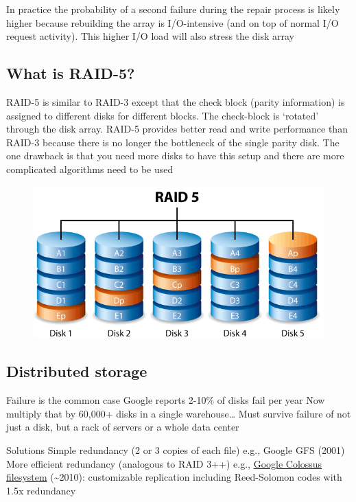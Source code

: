 In practice the probability of a second failure during the repair process is likely higher because rebuilding the array is I/O-intensive (and on top of normal I/O request activity). This higher I/O load will also stress the disk array

\subsection{What is RAID-5?}\label{what-is-raid-5}

RAID-5 is similar to RAID-3 except that the check block (parity information) is assigned to different disks for different blocks. The check-block is `rotated' through the disk array. RAID-5 provides better read and write performance than RAID-3 because there is no longer the bottleneck of the single parity disk. The one drawback is that you need more disks to have this setup and there are more complicated algorithms need to be used

\begin{figure}[htbp]
\centering
\includegraphics[width=.8\textwidth]{filesystems/images/raid_5.png}
\caption{}
\end{figure}

\subsection{Distributed storage}\label{distributed-storage}

Failure is the common case Google reports 2-10\% of disks fail per year Now multiply that by 60,000+ disks in a single warehouse\ldots{} Must survive failure of not just a disk, but a rack of servers or a whole data center

Solutions Simple redundancy (2 or 3 copies of each file) e.g., Google GFS (2001) More efficient redundancy (analogous to RAID 3++) e.g., \href{http://goo.gl/LwFIy}{Google Colossus filesystem} (\textasciitilde{}2010): customizable replication including Reed-Solomon codes with 1.5x redundancy

